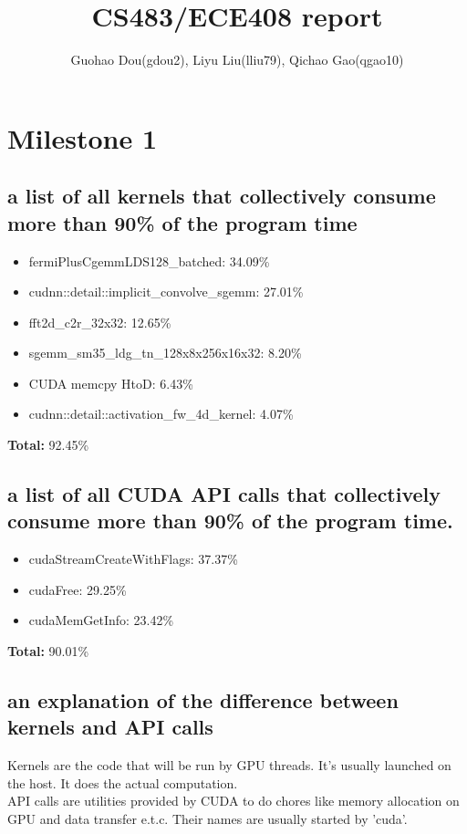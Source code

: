 \documentclass[12pt]{article}
\begin{document}

\title{CS483/ECE408 report}
\author{Guohao Dou(gdou2), Liyu Liu(lliu79), Qichao Gao(qgao10)}
\maketitle

\section{Milestone 1}
\subsection{a list of all kernels that collectively consume more than 90\% of the program time}
\begin{itemize}
    \item fermiPlusCgemmLDS128\_batched: 34.09\%
    \item cudnn::detail::implicit\_convolve\_sgemm: 27.01\%
    \item fft2d\_c2r\_32x32: 12.65\%
    \item sgemm\_sm35\_ldg\_tn\_128x8x256x16x32: 8.20\%
    \item CUDA memcpy HtoD: 6.43\%
    \item cudnn::detail::activation\_fw\_4d\_kernel: 4.07\%
\end{itemize}
\textbf{Total: } 92.45\%

\subsection{a list of all CUDA API calls that collectively consume more than 90\% of the program time.}
\begin{itemize}
    \item cudaStreamCreateWithFlags: 37.37\%
    \item cudaFree: 29.25\%
    \item cudaMemGetInfo: 23.42\%
\end{itemize}
\textbf{Total: } 90.01\%

\subsection{an explanation of the difference between kernels and API calls}
Kernels are the code that will be run by GPU threads. It's usually launched on the host. It does the actual computation.\\
API calls are utilities provided by CUDA to do chores like memory allocation on GPU and data transfer e.t.c. Their names are usually started by 'cuda'.
\end{document}
